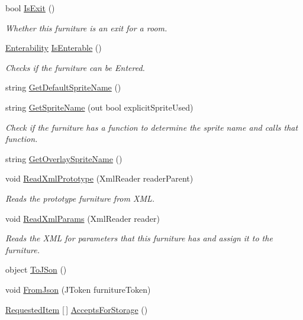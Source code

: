 \begin{DoxyCompactItemize}
bool \hyperlink{class_furniture_a88048e4444b4b10eb7826876798a4f0f}{Is\+Exit} ()
\begin{DoxyCompactList}\small\item\em Whether this furniture is an exit for a room. \end{DoxyCompactList}\item 
\hyperlink{_tile_8cs_a48a7177f465b04f310ccf25ae69d070a}{Enterability} \hyperlink{class_furniture_ac904b310f6d33670dd836b9c05da9496}{Is\+Enterable} ()
\begin{DoxyCompactList}\small\item\em Checks if the furniture can be Entered. \end{DoxyCompactList}\item 
string \hyperlink{class_furniture_a93e5bf048fbaa6d99f45f15d62b99915}{Get\+Default\+Sprite\+Name} ()
\item 
string \hyperlink{class_furniture_a9820e3379b92d0765131a3bbe0383c6e}{Get\+Sprite\+Name} (out bool explicit\+Sprite\+Used)
\begin{DoxyCompactList}\small\item\em Check if the furniture has a function to determine the sprite name and calls that function. \end{DoxyCompactList}\item 
string \hyperlink{class_furniture_a841c1151284cf19735791658688fd77d}{Get\+Overlay\+Sprite\+Name} ()
\item 
void \hyperlink{class_furniture_a28d8b4c5024c93c5d4da4879ce6c2f2b}{Read\+Xml\+Prototype} (Xml\+Reader reader\+Parent)
\begin{DoxyCompactList}\small\item\em Reads the prototype furniture from X\+ML. \end{DoxyCompactList}\item 
void \hyperlink{class_furniture_a810a91747971fea72daee137e8aab9f5}{Read\+Xml\+Params} (Xml\+Reader reader)
\begin{DoxyCompactList}\small\item\em Reads the X\+ML for parameters that this furniture has and assign it to the furniture. \end{DoxyCompactList}\item 
object \hyperlink{class_furniture_a70a11718cc06b20399767ac765ef52e7}{To\+J\+Son} ()
\item 
void \hyperlink{class_furniture_aeedc1bfd6d4fedeb81b839f89a545583}{From\+Json} (J\+Token furniture\+Token)
\item 
\hyperlink{class_project_porcupine_1_1_jobs_1_1_requested_item}{Requested\+Item} \mbox{[}$\,$\mbox{]} \hyperlink{class_furniture_ad88bf85157a61bb143b5347e6492a905}{Accepts\+For\+Storage} ()

\end{DoxyCompactItemize}
